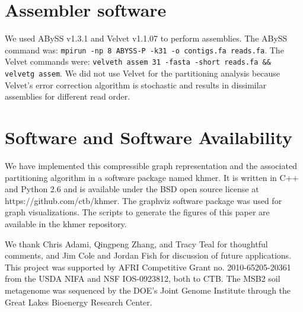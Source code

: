 \documentclass{pnastwo}
\begin{document}
\begin{article}
\begin{materials}
\section{Assembler software}

We used ABySS v1.3.1 and Velvet v1.1.07 to perform assemblies.  The
ABySS command was: {\tt mpirun -np 8 ABYSS-P -k31 -o contigs.fa
  reads.fa}.  The Velvet commands were: {\tt velveth assem 31 -fasta
  -short reads.fa \&\& velvetg assem}.  We did not use Velvet for the
partitioning analysis because Velvet's error correction algorithm is
stochastic and results in dissimilar assemblies for different read
order.

\section{Software and Software Availability}

We have implemented this compressible graph representation and the
associated partitioning algorithm in a software package named khmer.
It is written in C++ and Python 2.6 and is available under the BSD
open source license at https://github.com/ctb/khmer.  The graphviz
software package was used for graph visualizations. The scripts to
generate the figures of this paper are available in the khmer
repository.

\end{materials}

\begin{acknowledgments}

We thank Chris Adami, Qingpeng Zhang, and Tracy Teal for thoughtful
comments, and Jim Cole and Jordan Fish for discussion of future
applications.  This project was supported by AFRI Competitive Grant
no. 2010-65205-20361 from the USDA NIFA and NSF IOS-0923812, both to
CTB.  The MSB2 soil metagenome was sequenced by the DOE's Joint Genome
Institute through the Great Lakes Bioenergy Research Center.


\end{acknowledgments}


%

%

\begin{thebibliography}{10}



\end{thebibliography}
\end{article}
\end{document}
